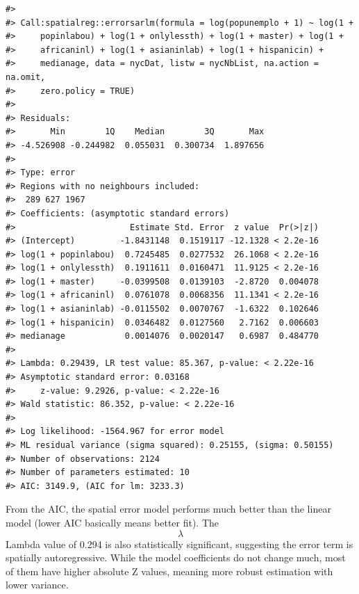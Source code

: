 \documentclass[
  11pt,
]{book}
\begin{document}
\begin{verbatim}
#> 
#> Call:spatialreg::errorsarlm(formula = log(popunemplo + 1) ~ log(1 + 
#>     popinlabou) + log(1 + onlylessth) + log(1 + master) + log(1 + 
#>     africaninl) + log(1 + asianinlab) + log(1 + hispanicin) + 
#>     medianage, data = nycDat, listw = nycNbList, na.action = na.omit, 
#>     zero.policy = TRUE)
#> 
#> Residuals:
#>       Min        1Q    Median        3Q       Max 
#> -4.526908 -0.244982  0.055031  0.300734  1.897656 
#> 
#> Type: error 
#> Regions with no neighbours included:
#>  289 627 1967 
#> Coefficients: (asymptotic standard errors) 
#>                       Estimate Std. Error  z value  Pr(>|z|)
#> (Intercept)         -1.8431148  0.1519117 -12.1328 < 2.2e-16
#> log(1 + popinlabou)  0.7245485  0.0277532  26.1068 < 2.2e-16
#> log(1 + onlylessth)  0.1911611  0.0160471  11.9125 < 2.2e-16
#> log(1 + master)     -0.0399508  0.0139103  -2.8720  0.004078
#> log(1 + africaninl)  0.0761078  0.0068356  11.1341 < 2.2e-16
#> log(1 + asianinlab) -0.0115502  0.0070767  -1.6322  0.102646
#> log(1 + hispanicin)  0.0346482  0.0127560   2.7162  0.006603
#> medianage            0.0014076  0.0020147   0.6987  0.484770
#> 
#> Lambda: 0.29439, LR test value: 85.367, p-value: < 2.22e-16
#> Asymptotic standard error: 0.03168
#>     z-value: 9.2926, p-value: < 2.22e-16
#> Wald statistic: 86.352, p-value: < 2.22e-16
#> 
#> Log likelihood: -1564.967 for error model
#> ML residual variance (sigma squared): 0.25155, (sigma: 0.50155)
#> Number of observations: 2124 
#> Number of parameters estimated: 10 
#> AIC: 3149.9, (AIC for lm: 3233.3)
\end{verbatim}

From the AIC, the spatial error model performs much better than the linear model (lower AIC basically means better fit). The \[\lambda\] Lambda value of 0.294 is also statistically significant, suggesting the error term is spatially autoregressive. While the model coefficients do not change much, most of them have higher absolute Z values, meaning more robust estimation with lower variance.
\end{document}
